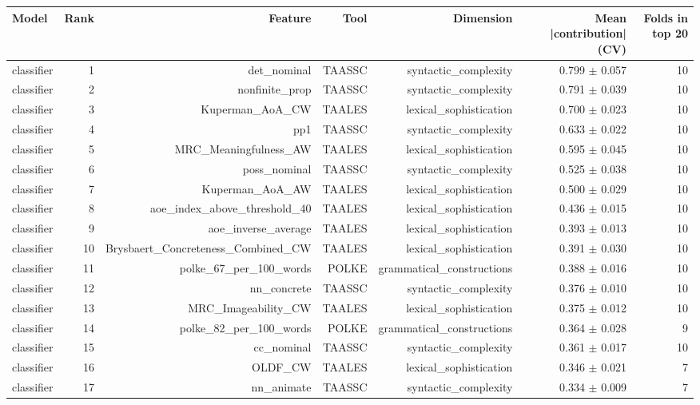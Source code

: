 \begin{table}[t]
\centering
\small
\begin{tabular}{lrrrrrr}
\toprule
Model & Rank & Feature & Tool & Dimension & Mean |contribution| (CV) & Folds in top 20 \\
\midrule
classifier & 1 & det\_nominal & TAASSC & syntactic\_complexity & 0.799 $\pm$ 0.057 & 10 \\
classifier & 2 & nonfinite\_prop & TAASSC & syntactic\_complexity & 0.791 $\pm$ 0.039 & 10 \\
classifier & 3 & Kuperman\_AoA\_CW & TAALES & lexical\_sophistication & 0.700 $\pm$ 0.023 & 10 \\
classifier & 4 & pp1 & TAASSC & syntactic\_complexity & 0.633 $\pm$ 0.022 & 10 \\
classifier & 5 & MRC\_Meaningfulness\_AW & TAALES & lexical\_sophistication & 0.595 $\pm$ 0.045 & 10 \\
classifier & 6 & poss\_nominal & TAASSC & syntactic\_complexity & 0.525 $\pm$ 0.038 & 10 \\
classifier & 7 & Kuperman\_AoA\_AW & TAALES & lexical\_sophistication & 0.500 $\pm$ 0.029 & 10 \\
classifier & 8 & aoe\_index\_above\_threshold\_40 & TAALES & lexical\_sophistication & 0.436 $\pm$ 0.015 & 10 \\
classifier & 9 & aoe\_inverse\_average & TAALES & lexical\_sophistication & 0.393 $\pm$ 0.013 & 10 \\
classifier & 10 & Brysbaert\_Concreteness\_Combined\_CW & TAALES & lexical\_sophistication & 0.391 $\pm$ 0.030 & 10 \\
classifier & 11 & polke\_67\_per\_100\_words & POLKE & grammatical\_constructions & 0.388 $\pm$ 0.016 & 10 \\
classifier & 12 & nn\_concrete & TAASSC & syntactic\_complexity & 0.376 $\pm$ 0.010 & 10 \\
classifier & 13 & MRC\_Imageability\_CW & TAALES & lexical\_sophistication & 0.375 $\pm$ 0.012 & 10 \\
classifier & 14 & polke\_82\_per\_100\_words & POLKE & grammatical\_constructions & 0.364 $\pm$ 0.028 & 9 \\
classifier & 15 & cc\_nominal & TAASSC & syntactic\_complexity & 0.361 $\pm$ 0.017 & 10 \\
classifier & 16 & OLDF\_CW & TAALES & lexical\_sophistication & 0.346 $\pm$ 0.021 & 7 \\
classifier & 17 & nn\_animate & TAASSC & syntactic\_complexity & 0.334 $\pm$ 0.009 & 7 \\

\end{tabular}
\end{table}

